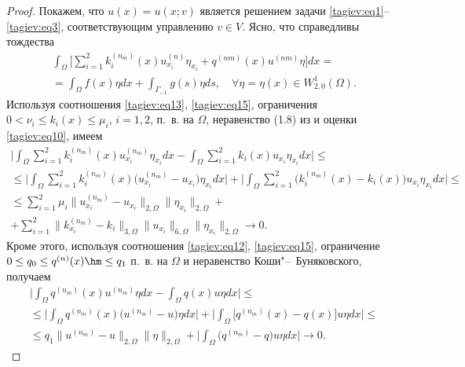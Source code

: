 \begin{proof}
Покажем, что $u ( x )=u (x; v )$  является решением задачи \eqref{tagiev:eq1}--\eqref{tagiev:eq3}, соответствующим 
управлению $ v  \in V$. 
Ясно, что справедливы тождества
\begin{multline}
\label{tagiev:eq16}
\int _\Omega \biggl[\sum\limits_{i=1}^2 k_i^{( n_m )} ( x ) u_{x_i }^{ ( n )} \eta _{x_i} 
+q^{ ( nm )} ( x )u^{ ( nm )}\eta \biggr]dx = \\ 
=\int _\Omega f ( x )\eta dx  +\int _{\Gamma _{-1}} g ( s )\eta ds, \quad  \forall \eta =\eta ( x )\in W_{2,0}^1 ( \Omega ).
\end{multline}
Используя соотношения \eqref{tagiev:eq13}, \eqref{tagiev:eq15}, ограничения $0<\nu _i \le k_i ( x 
 )\le \mu _i$, $i=1, 2$, п.~в. на $\Omega$,  неравенство (1.8) из \cite[с.~67]{tagiev:bib17} и оценки \eqref{tagiev:eq10}, имеем
\begin{multline}
\label{tagiev:eq17}
\biggl| \int _\Omega \sum\limits_{i=1}^2 k_i^{ ( n_m )} ( x )u_{x_i }^{ (n_m)} \eta_{x_i} 
dx-\int _\Omega \sum\limits_{i=1}^2 k_i ( x )u_{x_i } \eta _{x_i } dx \biggr|\le\\
\le 
\biggl|\int _\Omega 
\sum\limits_{i=1}^2 k_i^{ ( n_m )} ( x ) \bigl( u_{x_i }^{ ( {n_m } )} -u_{x_i } \bigr)\eta _{x_i } dx \biggr|+ 
\biggl|\int _\Omega \sum\limits_{i=1}^2 \bigl( k_i^{(n_m)} ( x )-k_i ( x ) \bigr)u_{x_i} \eta _{x_i} dx\biggr|
\le 
\\
\le
\sum\limits_{i=1}^2 \mu _i \bigl\|u_{x_i }^{(n_m )} -u_{x_i } \bigr \|_{2,\Omega } 
\bigl\|\eta _{x_i }\bigr \|_{2,\Omega } + \\ 
 +\sum\limits_{i=1}^2 \bigl \| k_{x_i }^{ (n_m )} -k_i \bigr 
 \|_{3,\Omega }\bigl\| u_{x_i } \bigr \|_{6,\Omega }  
 \bigl\|  \eta _{x_i } \bigr \|_{2,\Omega } \to 0. 
\end{multline}
Кроме этого, используя соотношения \eqref{tagiev:eq12}, \eqref{tagiev:eq15}, ограничение $0\le q_0 \le 
q^{ ( n )} ( x ) \hm \le q_1$ п.~в. на $\Omega $ и 
неравенство Коши"--~Буняковского, получаем
\begin{multline}
\label{tagiev:eq18}
 \biggl|\int _\Omega q^{ ( n_m)} ( x  )u^{ (n_m)}\eta dx-\int _\Omega q (x) u \eta dx \biggr |\le 
\\
\le  
 \biggl|\int _\Omega q^{ (n_m)} ( x )  \bigl(u^{ ( n_m )}-u \bigr)\eta dx\biggr | %
 + \biggl| \int _\Omega \bigl[q^{ ( n_m )} ( x )-q ( x ) \bigr] u\eta dx \biggr|\le
 \\
 \le
q_1 \bigl\|u^{ ( n_m )}-u \bigr\|_{2,\Omega}  \| \eta   \|_{2,\Omega} +
 \biggl| \int _\Omega \bigl(q^{ (n_m )}-q  \bigr)u\eta dx \biggr|\to 0.
\end{multline}


\end{proof}
